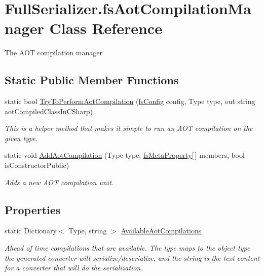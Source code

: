 \hypertarget{class_full_serializer_1_1fs_aot_compilation_manager}{}\section{Full\+Serializer.\+fs\+Aot\+Compilation\+Manager Class Reference}
\label{class_full_serializer_1_1fs_aot_compilation_manager}


The A\+OT compilation manager  


\subsection*{Static Public Member Functions}
\begin{DoxyCompactItemize}
\item 
static bool \hyperlink{class_full_serializer_1_1fs_aot_compilation_manager_ad63036b8772e8717639e930d0d5415be}{Try\+To\+Perform\+Aot\+Compilation} (\hyperlink{class_full_serializer_1_1fs_config}{fs\+Config} config, Type type, out string aot\+Compiled\+Class\+In\+C\+Sharp)
\begin{DoxyCompactList}\small\item\em This is a helper method that makes it simple to run an A\+OT compilation on the given type. \end{DoxyCompactList}\item 
static void \hyperlink{class_full_serializer_1_1fs_aot_compilation_manager_a95d8b88a7886091eb43f70a4eeb20adc}{Add\+Aot\+Compilation} (Type type, \hyperlink{class_full_serializer_1_1_internal_1_1fs_meta_property}{fs\+Meta\+Property}\mbox{[}$\,$\mbox{]} members, bool is\+Constructor\+Public)
\begin{DoxyCompactList}\small\item\em Adds a new A\+OT compilation unit. \end{DoxyCompactList}\end{DoxyCompactItemize}
\subsection*{Properties}
\begin{DoxyCompactItemize}
\item 
static Dictionary$<$ Type, string $>$ \hyperlink{class_full_serializer_1_1fs_aot_compilation_manager_afa91f1d1f6154eb766f650bc3abe631c}{Available\+Aot\+Compilations}
\begin{DoxyCompactList}\small\item\em Ahead of time compilations that are available. The type maps to the object type the generated converter will serialize/deserialize, and the string is the text content for a converter that will do the serialization. \end{DoxyCompactList}\end{DoxyCompactItemize}


